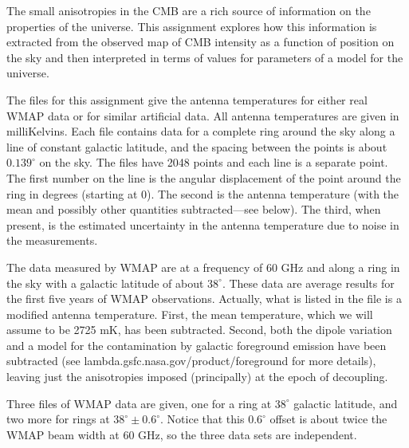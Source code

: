 \documentclass[12pt]{article}
\begin{document}
\newcommand{\mpc}{\mathrm{Mpc}}
\newcommand{\km}{\mathrm{km}}
\newcommand{\solarmass}{M_{\odot}}
\newcommand{\s}{\mathrm{sec}}
\newcommand{\is}{\sec^{-1}}
\newcommand{\ikm}{\km^{-1}}
\newcommand{\impc}{\mpc^{-1}}

\newcommand{\reh}{r_\mathrm{eh}}
\newcommand{\rh}{t_\mathrm{h}}
\newcommand{\el}{\epsilon_\Lambda}

\newcommand{\hea}{\(\,^4\mathrm{He}\,\)}
\newcommand{\heplus}{\(\mathrm{He}^+\,\)}

\newcommand{\ev}{\,\mathrm{eV}}

\newcommand{\mean}[1]{\left< #1\right>}
\newcommand{\ct}{\(C(\theta)\,\)}

The small anisotropies in the CMB are a rich source of information on the properties of the universe. This assignment explores how this information is extracted from the observed map of CMB intensity as a function of position on the sky and then interpreted in terms of values for parameters of a model for the universe.

The files for this assignment give the antenna temperatures for either real WMAP data or for similar artificial data. All antenna temperatures are given in milliKelvins. Each file contains data for a complete ring around the sky along a line of constant galactic latitude, and the spacing between the points is about \(0.139^\circ\) on the sky. The files have 2048 points and each line is a separate point. The first number on the line is the angular displacement of the point around the ring in degrees (starting at 0). The second is the antenna temperature (with the mean and possibly other quantities subtracted---see below). The third, when present, is the estimated uncertainty in the antenna temperature due to noise in the measurements.

The data measured by WMAP are at a frequency of 60 GHz and along a ring in the sky with a galactic latitude of about \(38^\circ\). These data are average results for the first five years of WMAP observations. Actually, what is listed in the file is a modified antenna temperature. First, the mean temperature, which we will assume to be 2725 mK, has been subtracted. Second, both the dipole variation and a model for the contamination by galactic foreground emission have been subtracted (see lambda.gsfc.nasa.gov/product/foreground for more details), leaving just the anisotropies imposed (principally) at the epoch of decoupling.

Three files of WMAP data are given, one for a ring at \(38^\circ\) galactic latitude, and two more for rings at \(38^\circ \pm 0.6^\circ\). Notice that this \(0.6^{\circ}\) offset is about twice the WMAP beam width at 60 GHz, so the three data sets are independent.
\end{document}
